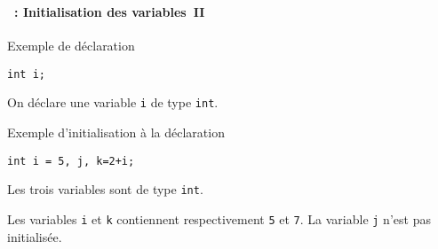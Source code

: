 \begin{frame}[containsverbatim]
  \frametitle{\secname}
  \framesubtitle{\subsecname~: Initialisation des variables~II}

  \begin{block}{Exemple de déclaration}
    \begin{verbatim}
int i;
    \end{verbatim}
  \end{block}
  \par
  On déclare une variable \texttt{i} de type \texttt{int}.
  \begin{block}{Exemple d'initialisation à la déclaration}
    \begin{verbatim}
int i = 5, j, k=2+i;
    \end{verbatim}
  \end{block}
  \par
  Les trois variables sont de type \texttt{int}. 
  \par
  Les variables \texttt{i} et \texttt{k} contiennent respectivement \texttt{5} et \texttt{7}. La variable \texttt{j} n'est pas initialisée.  
\end{frame}

